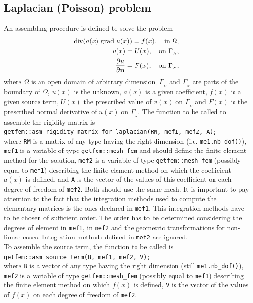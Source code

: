 \documentclass[11pt,a4paper]{article}
\begin{document}
\subsection{Laplacian (Poisson) problem}

An assembling procedure is defined to solve the problem
\begin{eqnarray*}
  \mbox{div}(a(x)\ \mbox{grad }u(x)) = f(x), \ \ \mbox{ in } \Omega, \\
  u(x) = U(x),  \ \ \mbox{ on } \Gamma_{_D}, \\
  {\displaystyle \frac{\displaystyle \partial u}{\displaystyle \partial \bf n}} = F(x),  \ \ \mbox{ on } \Gamma_{_N},   
\end{eqnarray*}
where $\Omega$ is an open domain of arbitrary dimension, $\Gamma_{_D}$ and $\Gamma_{_N}$ are parts of the boundary of $\Omega$, $u(x)$ is the unknown, $a(x)$ is a given coefficient, $f(x)$ is a given source term, $U(x)$ the prescribed value of $u(x)$ on $\Gamma_{_D}$ and $F(x)$ is the prescribed normal derivative of $u(x)$ on $\Gamma_{_N}$.
The function to be called to assemble the rigidity matrix is\\[0.5cm]
{\tt getfem::asm\_rigidity\_matrix\_for\_laplacian(RM, mef1, mef2, A);} \\[0.5cm]
where {\tt RM} is a matrix of any type having the right dimension (i.e. {\tt me1.nb\_dof()}), {\tt mef1} is a variable of type {\tt getfem::mesh\_fem} and should define the finite element method for the solution, {\tt mef2}  is a variable of type {\tt getfem::mesh\_fem} (possibly equal to {\tt mef1}) describing the finite element method on which the coefficient $a(x)$ is defined, and {\tt A} is the vector of the values of this coefficient on each degree of freedom of {\tt mef2}. Both should use the same mesh. It is important to pay attention to the fact that the integration methods used to compute the elementary matrices is the ones declared in {\tt mef1}. This integration methods have to be chosen of sufficient order. The order has to be determined considering the degrees of element in {\tt mef1}, in {\tt mef2} and the geometric transformations for non-linear cases. Integration methods defined in {\tt mef2} are ignored.\\[0.5cm]
To assemble the source term, the  function to be called is\\[0.5cm]
{\tt getfem::asm\_source\_term(B, mef1, mef2, V);} \\[0.5cm]
where {\tt B} is a vector of any type having the right dimension (still {\tt me1.nb\_dof()}), {\tt mef2}  is a variable of type {\tt getfem::mesh\_fem} (possibly equal to {\tt mef1}) describing the finite element method on which $f(x)$ is defined, {\tt V} is the vector of the values of $f(x)$ on each degree of freedom of {\tt mef2}.\\[0.5cm]
\end{document}
